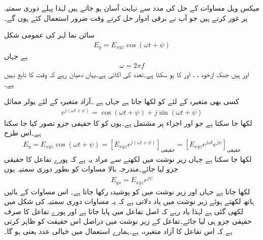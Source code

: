 میکس ویل مساوات کے حل  کی مدد سے نہایت آسان ہو جاتے ہیں لہٰذا پہلے دوری سمتیہ پر غور کرتے ہیں جو آپ نے برقی ادوار حل کرتے وقت ضرور استعمال کئے ہوں گے۔

سائن نما لہر کی عمومی شکل 
\begin{align}\label{مساوات_موج_اصل_سائن_نما_تفاعل}
E_y =E_{xyz} \cos (\omega t +\psi)
\end{align} 
ہے جہاں
\begin{align}
\omega =2\pi f
\end{align}
 اور   ہیں جبکہ  ازخود ، ،  اور  کا  ہو سکتا ہے۔تعدد  کی اکائی  ہے۔یہاں دھیان رہے کہ  وقت  کا تابع نہیں ہے۔

کسی بھی متغیرہ  کے لئے   کو  لکھا جاتا ہے جہاں   ہے ۔آزاد متغیرہ  کے لئے یولر مماثل
\begin{align*}
e^{j (\omega t +\psi)}=\cos (\omega t +\psi) +j \sin (\omega t +\psi)
\end{align*}
لکھا جا سکتا ہے جو  اور  اجزاء پر مشتمل   ہے۔یوں  کو  کا حقیقی جزو تصور کیا جا سکتا ہے۔اس طرح
\begin{align*}
E_y=E_{xyz} \cos (\omega t +\psi)= \left[E_{xyz} e^{j(\omega t +\psi)}\right]_{\textrm{حقیقی}}= \left[E_{xyz} e^{j \omega t }e^{j\psi}\right]_{\textrm{حقیقی}}
\end{align*}
لکھا جا سکتا ہے جہاں زیر نوشت میں  لکھنے سے مراد یہ ہے کہ پورے تفاعل کا حقیقی جزو لیا جائے۔مندرجہ بالا مساوات کو بطور دوری سمتیہ یوں
\begin{align*}
E_{ys} =E_{xyz} e^{j \psi}
\end{align*}
 لکھا جاتا ہے جہاں   اور زیر نوشت میں  کو پوشیدہ رکھا جاتا ہے۔ اس مساوات کے بائیں ہاتھ  لکھتے ہوئے زیر نوشت میں  یاد دلاتی ہے کہ یہ مساوات دوری سمتیہ کی شکل میں لکھی گئی ہے لہٰذا یاد رہے کہ اصل تفاعل میں  پایا جاتا ہے اور پورے تفاعل کا صرف حقیقی جزو ہی لیا جائے۔تفاعل  کے زیر نوشت میں  دراصل اس حقیقت کو ظاہر کرتی ہے کہ  اس تفاعل کا آزاد متغیرہ،   ہے۔ہمارے استعمال میں   خیالی عدد یعنی  ہو گا۔


